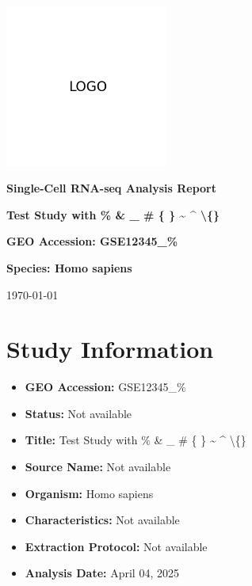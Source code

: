\documentclass[12pt]{article}
\begin{document}
\begin{titlepage}
    \centering
    \vspace*{2cm}

    \includegraphics[width=0.4\textwidth]{scagentic_logo.png}
    \vspace{1cm}

    \Huge\textbf{Single-Cell RNA-seq Analysis Report}
    \vspace{1cm}

    \Large\textbf{Test Study with \% \& \_ \# \{ \} \textasciitilde{} \textasciicircum{} \textbackslash\{\}}
    \vspace{0.5cm}

    \Large\textbf{GEO Accession: GSE12345\_\%}
    \vspace{0.5cm}

    \Large\textbf{Species: Homo sapiens}
    \vspace{0.5cm}
    \vspace{1cm}

    \large\today
\end{titlepage}

\tableofcontents
\newpage

\section{Study Information}
\begin{itemize}
    \item \textbf{GEO Accession:} GSE12345\_\%
    \item \textbf{Status:} Not available
    \item \textbf{Title:} Test Study with \% \& \_ \# \{ \} \textasciitilde{} \textasciicircum{} \textbackslash\{\}
    \item \textbf{Source Name:} Not available
    \item \textbf{Organism:} Homo sapiens
    \item \textbf{Characteristics:} Not available
    \item \textbf{Extraction Protocol:} Not available
    \item \textbf{Analysis Date:} {April 04, 2025}
\end{itemize}
\end{document}
